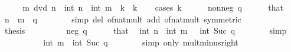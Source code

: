 \begin{isabellebody}
%
\isadelimproof
%
\endisadelimproof
%
\isatagproof
{}\isamarkupfalse%
\ {\isacharminus}{\kern0pt}\isanewline
\ \ \isamarkupfalse%
\ {\isachardoublequoteopen}m\ dvd\ n{\isachardoublequoteclose}\ \ {\isachardoublequoteopen}int\ n\ {\isacharequal}{\kern0pt}\ int\ m\ {\isacharasterisk}{\kern0pt}\ k{\isachardoublequoteclose}\ \ k\isanewline
\ \ \isamarkupfalse%
\ {\isacharparenleft}{\kern0pt}cases\ k{\isacharparenright}{\kern0pt}\isanewline
\ \ \ \ \isamarkupfalse%
\ {\isacharparenleft}{\kern0pt}nonneg\ q{\isacharparenright}{\kern0pt}\isanewline
\ \ \ \ \isamarkupfalse%
\ that\ \isamarkupfalse%
\ {\isachardoublequoteopen}n\ {\isacharequal}{\kern0pt}\ m\ {\isacharasterisk}{\kern0pt}\ q{\isachardoublequoteclose}\isanewline
\ \ \ \ \ \ \isamarkupfalse%
\ {\isacharparenleft}{\kern0pt}simp\ del{\isacharcolon}{\kern0pt}\ of{\isacharunderscore}{\kern0pt}nat{\isacharunderscore}{\kern0pt}mult\ add{\isacharcolon}{\kern0pt}\ of{\isacharunderscore}{\kern0pt}nat{\isacharunderscore}{\kern0pt}mult\ {\isacharbrackleft}{\kern0pt}symmetric{\isacharbrackright}{\kern0pt}{\isacharparenright}{\kern0pt}\isanewline
\ \ \ \ \isamarkupfalse%
\ \isamarkupfalse%
\ {\isacharquery}{\kern0pt}thesis\ \isacommand{{\isachardot}{\kern0pt}{\isachardot}{\kern0pt}}\isamarkupfalse%
\isanewline
\ \ \isamarkupfalse%
\isanewline
\ \ \ \ \isamarkupfalse%
\ {\isacharparenleft}{\kern0pt}neg\ q{\isacharparenright}{\kern0pt}\isanewline
\ \ \ \ \isamarkupfalse%
\ that\ \isamarkupfalse%
\ {\isachardoublequoteopen}int\ n\ {\isacharequal}{\kern0pt}\ int\ m\ {\isacharasterisk}{\kern0pt}\ {\isacharparenleft}{\kern0pt}{\isacharminus}{\kern0pt}\ int\ {\isacharparenleft}{\kern0pt}Suc\ q{\isacharparenright}{\kern0pt}{\isacharparenright}{\kern0pt}{\isachardoublequoteclose}\isanewline
\ \ \ \ \ \ \isamarkupfalse%
\ simp\isanewline
\ \ \ \ \isamarkupfalse%
\ \isamarkupfalse%
\ {\isachardoublequoteopen}{\isasymdots}\ {\isacharequal}{\kern0pt}\ {\isacharminus}{\kern0pt}\ {\isacharparenleft}{\kern0pt}int\ m\ {\isacharasterisk}{\kern0pt}\ int\ {\isacharparenleft}{\kern0pt}Suc\ q{\isacharparenright}{\kern0pt}{\isacharparenright}{\kern0pt}{\isachardoublequoteclose}\isanewline
\ \ \ \ \ \ \isamarkupfalse%
\ {\isacharparenleft}{\kern0pt}simp\ only{\isacharcolon}{\kern0pt}\ mult{\isacharunderscore}{\kern0pt}minus{\isacharunderscore}{\kern0pt}right{\isacharparenright}{\kern0pt}\isanewline

\end{isabellebody}
